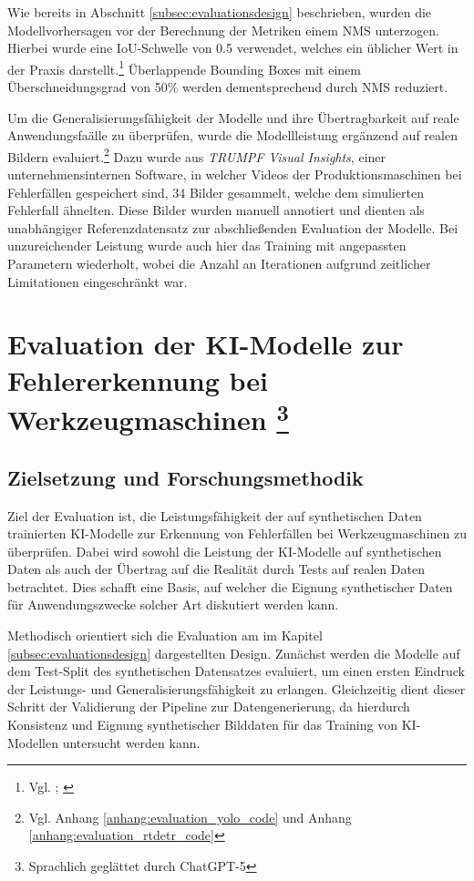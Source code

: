 Wie bereits in Abschnitt \ref{subsec:evaluationsdesign} beschrieben, wurden die Modellvorhersagen vor der Berechnung der Metriken einem \ac{NMS} unterzogen. Hierbei wurde eine \ac{IoU}-Schwelle von 0.5 verwendet, welches ein üblicher Wert in der Praxis darstellt.\footnote{Vgl. \cite[8]{he_mask_2017}; \cite[3]{bodla_soft-nms_2017}} Überlappende Bounding Boxes mit einem Überschneidungsgrad von 50\% werden dementsprechend durch \ac{NMS} reduziert.

Um die Generalisierungsfähigkeit der Modelle und ihre Übertragbarkeit auf reale Anwendungsfaälle zu überprüfen, wurde die Modellleistung ergänzend auf realen Bildern evaluiert.\footnote{Vgl. Anhang \ref{anhang:evaluation_yolo_code} und Anhang \ref{anhang:evaluation_rtdetr_code}} Dazu wurde aus \textit{TRUMPF Visual Insights}, einer unternehmensinternen Software, in welcher Videos der Produktionsmaschinen bei Fehlerfällen gespeichert sind, 34 Bilder gesammelt, welche dem simulierten Fehlerfall ähnelten. Diese Bilder wurden manuell annotiert und dienten als unabhängiger Referenzdatensatz zur abschließenden Evaluation der Modelle. Bei unzureichender Leistung wurde auch hier das Training mit angepassten Parametern wiederholt, wobei die Anzahl an Iterationen aufgrund zeitlicher Limitationen eingeschränkt war.




\chapter[Evaluation der KI-Modelle zur Fehlererkennung bei Werkzeugmaschinen]{Evaluation der \ac{KI}-Modelle zur Fehlererkennung bei Werkzeugmaschinen \footnote{Sprachlich geglättet durch ChatGPT-5}}
\label{chapter:Evaluation_Ergebnisse}

\section{Zielsetzung und Forschungsmethodik}
Ziel der Evaluation ist, die Leistungsfähigkeit der auf synthetischen Daten trainierten \ac{KI}-Modelle zur Erkennung von Fehlerfällen bei Werkzeugmaschinen zu überprüfen. Dabei wird sowohl die Leistung der KI-Modelle auf synthetischen Daten als auch der Übertrag auf die Realität durch Tests auf realen Daten betrachtet. Dies schafft eine Basis, auf welcher die Eignung synthetischer Daten für Anwendungszwecke solcher Art diskutiert werden kann.

Methodisch orientiert sich die Evaluation am im Kapitel \ref{subsec:evaluationsdesign} dargestellten Design. Zunächst werden die Modelle auf dem Test-Split des synthetischen Datensatzes evaluiert, um einen ersten Eindruck der Leistungs- und Generalisierungsfähigkeit zu erlangen. Gleichzeitig dient dieser Schritt der Validierung der Pipeline zur Datengenerierung, da hierdurch Konsistenz und Eignung synthetischer Bilddaten für das Training von \ac{KI}-Modellen untersucht werden kann.

